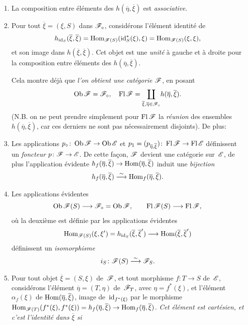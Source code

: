 \begin{enumerate}
\item[1)] La composition entre \'el\'ements des
$h(\overline{\eta},\overline{\xi})$
est \emph{associative}.
\item[2)]
Pour tout $\overline{\xi}=(\xi,S)$ dans $\cal{F}_\circ$,
consid\'erons l'\'el\'ement
identit\'e
de
$$
h_{\id_S}(\overline{\xi},\overline{\xi})=
\Hom_{\cal{F}(S)}(\id_S^*(\xi),\xi)=\Hom_{\cal{F}(S)}(\xi,\xi),
$$
et son image dans $h(\overline{\xi},\overline{\xi})$. Cet objet est
une \emph{unité} \`a gauche et \`a droite pour la composition
entre \'el\'ements des $h(\overline{\eta},\overline{\xi})$.

Cela montre d\'ej\`a que \emph{l'on obtient une catégorie}
$\cal{F}$, en posant
$$
\Ob\cal{F}=\cal{F}_\circ,\quad \Fl{\cal{F}}=
\underset{\overline{\xi},\overline{\eta}\in\cal{F}_\circ}
\coprod h(\overline{\eta},\overline{\xi}).
$$
(N.B. on ne peut prendre simplement pour $\Fl\cal{F}$ la
\emph{réunion} des ensembles $h(\overline{\eta},\overline{\xi})$,
car ces derniers ne sont pas n\'ecessairement disjoints). De plus:
\item[3)] Les applications $p_\circ\colon \Ob\cal{F}\to\Ob\cal{E}$ et
$p_1=(p_{\overline{\eta},\overline{\xi}})\colon\Fl\cal{F}\to\Fl{\cal{E}}$
d\'efinissent un \emph{foncteur} $p\colon\cal{F}\to\cal{E}$. De
cette fa\c con, $\cal{F}$ devient une cat\'egorie sur~$\cal{E}$, de
plus l'application \'evidente
$h_f(\overline{\eta},\overline{\xi})\to\Hom(\overline{\eta},\overline{\xi})$
induit une \emph{bijection}
$$
h_f(\overline{\eta},\overline{\xi})\overset{\sim}{\longrightarrow}
\operatorname{Hom}_f(\overline{\eta},\overline{\xi}).
$$
\item[4)] Les applications \'evidentes
$$ \Ob\cal{F}(S)\to\cal{F}_\circ=\Ob\cal{F},\qquad \Fl\cal{F}(S)\to
\Fl\cal{F},
$$
o\`u la deuxi\`eme est d\'efinie par les applications
\'evidentes
$$
\Hom_{\cal{F}(S)}(\xi,\xi')=
h_{\id_S}(\overline{\xi},\overline{\xi}')\to
\Hom(\overline{\xi},\overline{\xi}')
$$
d\'efinissent un \emph{isomorphisme}
$$
i_S \colon \cal{F}(S)\isomto\cal{F}_S.
$$
\item[5)] Pour tout objet $\overline{\xi}=(S,\xi)$ de~$\cal{F}$, et
tout morphisme $f\colon T\to S$ de~$\cal{E}$, consid\'erons
l'\'el\'ement $\overline{\eta}=(T,\eta)$ de~$\cal{F}_T$, avec
$\eta=f^*(\xi)$, et l'\'el\'ement $\alpha_f(\xi)$ de
$\operatorname{Hom}(\overline{\eta},\overline{\xi})$, image de~$\mathrm{id}_{f^*(\xi)}$ par
le morphisme
$\Hom_{\cal{F}(T)}(f^*(\xi),f^*(\xi))=h_f(\overline{\eta},\overline{\xi})
\to \Hom_f(\overline{\eta},\overline{\xi})$. \emph{Cet élément
est cartésien, et c'est l'identité dans $\overline{\xi}$ si}

\end{enumerate}
